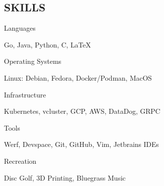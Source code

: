 \documentclass[line, margin, 10.5pt]{res}
\begin{document}
\begin{resume}
\section{\small SKILLS}
\begin{compactdesc}
    \item[Languages] \begin{inparaenum} {Go, Java, Python, C, \LaTeX} \end{inparaenum}
    \item[Operating Systems] \begin{inparaenum} {Linux: Debian, Fedora, Docker/Podman, MacOS} \end{inparaenum}
    \item[Infrastructure] \begin{inparaenum} {Kubernetes, vcluster, GCP, AWS, DataDog, GRPC} \end{inparaenum}
    \item[Tools] \begin{inparaenum} {Werf, Devspace, Git, GitHub, Vim, Jetbrains IDEs} \end{inparaenum}
    \item[Recreation] \begin{inparaenum} {Disc Golf, 3D Printing, Bluegrass Music} \end{inparaenum}
\end{compactdesc}

\end{resume}
\end{document}
